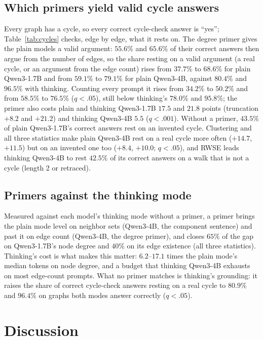 \documentclass[11pt]{article}
\begin{document}

\subsection{Which primers yield valid cycle answers}
\label{sec:executed}
Every graph has a cycle, so every correct cycle-check answer is ``yes''; Table~\ref{tab:cycles} checks, edge by edge, what it rests on. The degree primer gives the plain models a valid argument: $55.6\%$ and $65.6\%$ of their correct answers then argue from the number of edges, %
so the share resting on a valid argument (a real cycle, or an argument from the edge count) rises from $37.7\%$ to $68.6\%$ for plain Qwen3-1.7B and from $59.1\%$ to $79.1\%$ for plain Qwen3-4B, against $80.4\%$ and $96.5\%$ with thinking. Counting every prompt it rises from $34.2\%$ to $50.2\%$ and from $58.5\%$ to $76.5\%$ ($q<.05$), still below thinking's $78.0\%$ and $95.8\%$; %
the primer also costs plain and thinking Qwen3-1.7B $17.5$ and $21.8$ points (truncation $+8.2$ and $+21.2$) and thinking Qwen3-4B $5.5$ ($q<.001$). %
Without a primer, $43.5\%$ of plain Qwen3-1.7B's correct answers rest on an invented cycle. %
Clustering and all three statistics make plain Qwen3-4B rest on a real cycle more often ($+14.7$, $+11.5$) but on an invented one too ($+8.4$, $+10.0$; $q<.05$), %
and RWSE leads thinking Qwen3-4B to rest $42.5\%$ of its correct answers on a walk that is not a cycle (length 2 or retraced). %

\subsection{Primers against the thinking mode}
Measured against each model's thinking mode without a primer, a primer brings the plain mode level on neighbor sets (Qwen3-4B, the component sentence) and past it on edge count (Qwen3-4B, the degree primer), and closes $65\%$ of the gap on Qwen3-1.7B's node degree and $40\%$ on its edge existence (all three statistics). %
Thinking's cost is what makes this matter: $6.2$--$17.1$ times the plain mode's median tokens on node degree, and a budget that thinking Qwen3-4B exhausts on most edge-count prompts. %
What no primer matches is thinking's grounding: it raises the share of correct cycle-check answers resting on a real cycle to $80.9\%$ and $96.4\%$ on graphs both modes answer correctly ($q<.05$). %

\section{Discussion}
\label{sec:discussion}
\end{document}
